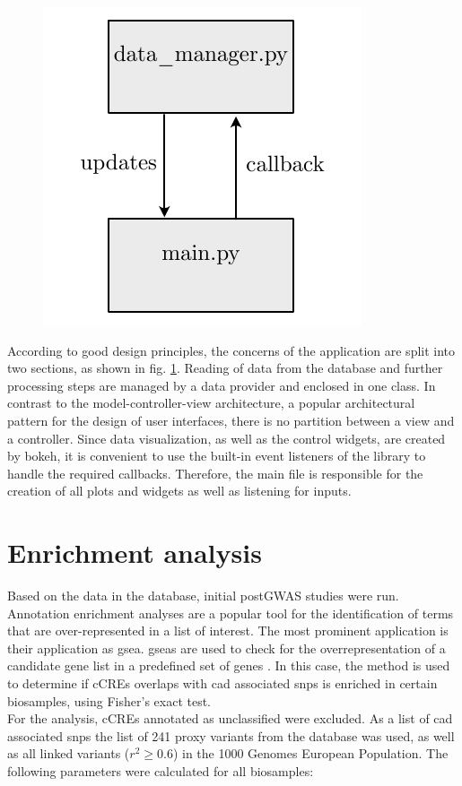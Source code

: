     \begin{figure}[h]
    \capstart
        \centering
    	\includegraphics{Abbildung/vis_architecture.pdf}

    	\begin{minipage}{\captionwidth}
    		\caption[vis archi]{}
    		\label{fig:plot_architecture}
    	\end{minipage}
    \end{figure}

According to good design principles, the concerns of the application are split into two sections, as shown in fig. \ref{fig:plot_architecture}. Reading of data from the database and further processing steps are managed by a data provider and enclosed in one class. In contrast to the model-controller-view architecture, a popular architectural pattern for the design of user interfaces, there is no partition between a view and a controller. Since data visualization, as well as the control widgets, are created by bokeh, it is convenient to use the built-in event listeners of the library to handle the required callbacks. Therefore, the main file is responsible for the creation of all plots and widgets as well as listening for inputs.

\section{Enrichment analysis}
\label{sec:enrichment}
Based on the data in the database, initial postGWAS studies were run. Annotation enrichment analyses are a popular tool for the identification of terms that are over-represented in a list of interest. The most prominent application is their application as \ac{gsea}. \Acp{gsea} are used to check for the overrepresentation of a candidate gene list in a predefined set of genes \cite{tipneyIntroductionEffectiveUse2010}. In this case, the method is used to determine if \acp{cCRE} overlaps with \ac{cad} associated \acp{snp} is enriched in certain biosamples, using Fisher's exact test.\\
For the analysis, \acp{cCRE} annotated as unclassified were excluded. As a list of \ac{cad} associated \acp{snp} the list of 241 proxy variants from the database was used, as well as all linked variants ($r^2\geq0.6$) in the 1000 Genomes European Population. The following parameters were calculated for all biosamples:

